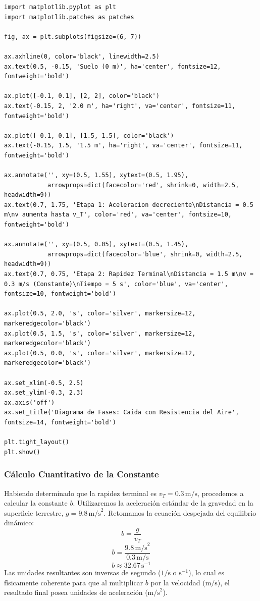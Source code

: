 \documentclass[12pt]{article}
\begin{document}
\begin{lstlisting}
import matplotlib.pyplot as plt
import matplotlib.patches as patches

fig, ax = plt.subplots(figsize=(6, 7))

ax.axhline(0, color='black', linewidth=2.5)
ax.text(0.5, -0.15, 'Suelo (0 m)', ha='center', fontsize=12, fontweight='bold')

ax.plot([-0.1, 0.1], [2, 2], color='black')
ax.text(-0.15, 2, '2.0 m', ha='right', va='center', fontsize=11, fontweight='bold')

ax.plot([-0.1, 0.1], [1.5, 1.5], color='black')
ax.text(-0.15, 1.5, '1.5 m', ha='right', va='center', fontsize=11, fontweight='bold')

ax.annotate('', xy=(0.5, 1.55), xytext=(0.5, 1.95), 
            arrowprops=dict(facecolor='red', shrink=0, width=2.5, headwidth=9))
ax.text(0.7, 1.75, 'Etapa 1: Aceleracion decreciente\nDistancia = 0.5 m\nv aumenta hasta v_T', color='red', va='center', fontsize=10, fontweight='bold')

ax.annotate('', xy=(0.5, 0.05), xytext=(0.5, 1.45), 
            arrowprops=dict(facecolor='blue', shrink=0, width=2.5, headwidth=9))
ax.text(0.7, 0.75, 'Etapa 2: Rapidez Terminal\nDistancia = 1.5 m\nv = 0.3 m/s (Constante)\nTiempo = 5 s', color='blue', va='center', fontsize=10, fontweight='bold')

ax.plot(0.5, 2.0, 's', color='silver', markersize=12, markeredgecolor='black')
ax.plot(0.5, 1.5, 's', color='silver', markersize=12, markeredgecolor='black')
ax.plot(0.5, 0.0, 's', color='silver', markersize=12, markeredgecolor='black')

ax.set_xlim(-0.5, 2.5)
ax.set_ylim(-0.3, 2.3)
ax.axis('off')
ax.set_title('Diagrama de Fases: Caida con Resistencia del Aire', fontsize=14, fontweight='bold')

plt.tight_layout()
plt.show()
\end{lstlisting}

\subsubsection*{Cálculo Cuantitativo de la Constante}
Habiendo determinado que la rapidez terminal es $v_T = 0.3 \, \text{m/s}$, procedemos a calcular la constante $b$. Utilizaremos la aceleración estándar de la gravedad en la superficie terrestre, $g = 9.8 \, \text{m/s}^2$.
Retomamos la ecuación despejada del equilibrio dinámico:
\begin{equation}
    b = \frac{g}{v_T}
\end{equation}
\begin{equation}
    b = \frac{9.8 \, \text{m/s}^2}{0.3 \, \text{m/s}}
\end{equation}
\begin{equation}
    b \approx 32.67 \, \text{s}^{-1}
\end{equation}
Las unidades resultantes son inversas de segundo ($1/\text{s}$ o $\text{s}^{-1}$), lo cual es físicamente coherente para que al multiplicar $b$ por la velocidad ($\text{m/s}$), el resultado final posea unidades de aceleración ($\text{m/s}^2$).
\end{document}
